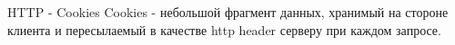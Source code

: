 \begin{frame}{HTTP - Cookies}
Cookies - небольшой фрагмент данных, хранимый на стороне клиента и пересылаемый в качестве http header серверу при каждом запросе.
\end{frame}
